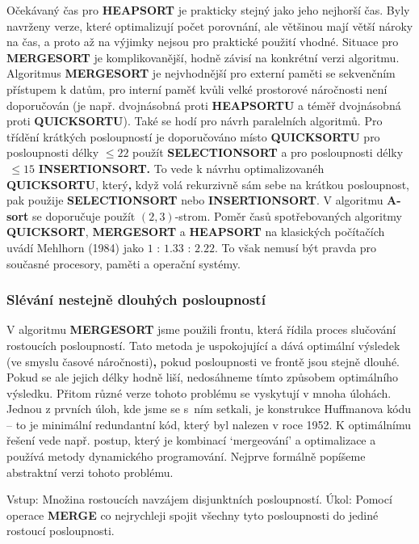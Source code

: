\documentclass[a4paper,12pt]{article}
\begin{document}
Očekávaný čas pro {\bf HEAPSORT} je prakticky stejný jako 
jeho nej\-horší čas.  Byly navrženy verze, které optimalizují 
počet porov\-nání, ale většinou mají větší nároky na 
čas, a proto až na výjimky ne\-jsou pro praktické 
použití vhodné.  
Situace pro {\bf MERGESORT} je komplikovanější, hod\-ně závisí 
na konkrétní verzi algoritmu.  Algoritmus 
{\bf MER\-GE\-SORT} je nejvhodnější pro externí paměti se  
sekvenčním přístupem k datům, pro interní 
paměť kvůli velké prostorové náročnosti 
není doporučován (je např. dvojnásobná proti {\bf HEAPSORTU }
a téměř dvojnásobná proti {\bf QUICKSORTU}). Také se hodí pro 
návrh pa\-ra\-lelních algoritmů. Pro třídění 
krátkých posloupností je doporučováno místo {\bf QUICKSORTU }
pro posloupnosti délky $\le 22$ použít {\bf SELECTIONSORT} a pro 
posloupnosti délky $\,\le 15$  {\bf INSERTIONSORT.}
To vede k návrhu optimalizovanéh {\bf QUICKSORTU}, 
který{\bf ,}  když 
volá rekurzivně sám sebe na krátkou posloupnost, pak 
použije {\bf SELECTIONSORT} ne\-bo {\bf INSERTIONSORT}. V algoritmu {\bf A-sort }
se doporu\-ču\-je použít $(2,3)$-strom.  
Poměr časů spotřebovaných  
algoritmy {\bf QUICKSORT},  {\bf MERGESORT} a {\bf HEAPSORT} na 
klasických počítačích uvádí Mehlhorn (1984) jako  
$1$ : $1.33$ : $2.22$. To 
však nemusí  být pravda pro současné procesory, 
paměti a operační systémy. 

\subsubsection{Slévání nestejně dlouhých posloupností}

V algoritmu {\bf MERGESORT} jsme použili frontu, která 
řídila proces slučování rostoucích posloupností.  Tato metoda je uspokojující a 
dává optimální výsledek (ve smyslu časové náročnosti){\bf ,} pokud posloupnosti ve frontě jsou 
stejně dlouhé.  Pokud se ale jejich délky hodně liší, 
nedosáhneme tímto způsobem  
optimálního výsledku.  Přitom různé verze tohoto 
problému se vyskytují v mnoha úlohách. Jednou z prvních úloh, 
kde jsme se s~ním setkali, je konstrukce 
Huffmanova kódu -- to je minimální redundantní kód, který byl 
nalezen v roce 1952. K optimálnímu řešení vede např. 
postup, který je kombinací `mergeování' a 
optimalizace a používá metody dynamického programování.  
Nejprve formálně popíšeme abstraktní verzi tohoto problému.  

Vstup: Množina rostoucích navzájem 
disjunktních posloupností.\newline 
Úkol:  Pomocí operace {\bf MERGE} co nejrychleji spojit 
všechny tyto posloupnosti do jediné rostoucí posloupnosti.  
\end{document}
